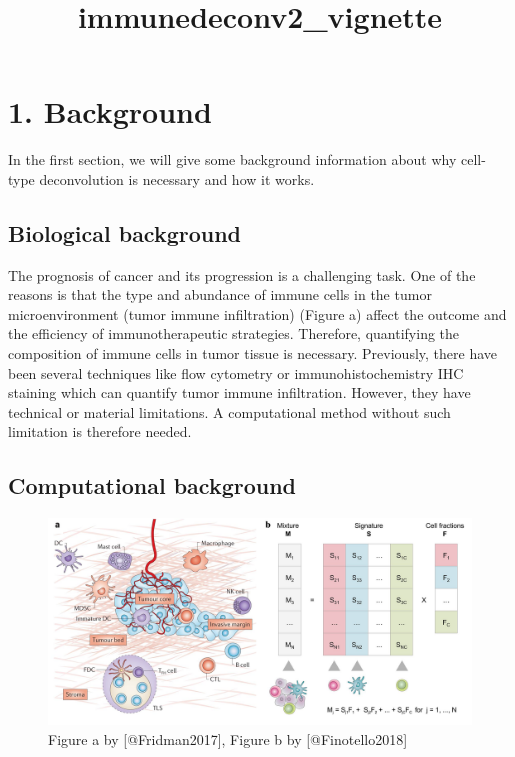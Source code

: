 \documentclass[
]{article}
\title{immunedeconv2\_vignette}
\author{}
\date{\vspace{-2.5em}}
\begin{document}
\maketitle

\hypertarget{background}{%
\section{1. Background}\label{background}}

In the first section, we will give some background information about why
cell-type deconvolution is necessary and how it works.

\hypertarget{biological-background}{%
\subsection{Biological background}\label{biological-background}}

The prognosis of cancer and its progression is a challenging task. One
of the reasons is that the type and abundance of immune cells in the
tumor microenvironment (tumor immune infiltration) (Figure a) affect the
outcome and the efficiency of immunotherapeutic strategies. Therefore,
quantifying the composition of immune cells in tumor tissue is
necessary. Previously, there have been several techniques like flow
cytometry or immunohistochemistry IHC staining which can quantify tumor
immune infiltration. However, they have technical or material
limitations. A computational method without such limitation is therefore
needed.

\hypertarget{computational-background}{%
\subsection{Computational background}\label{computational-background}}

\begin{figure}

{\centering \includegraphics[width=0.8\linewidth]{images/introduction} 

}

\caption{Figure a by [@Fridman2017], Figure b by [@Finotello2018]}\label{fig:introductionFigure}
\end{figure}
\end{document}
